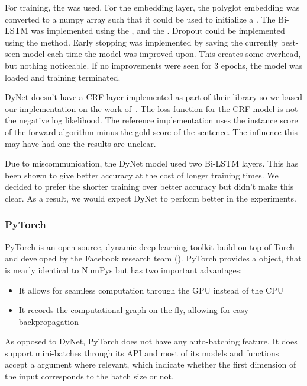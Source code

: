For training, the  was used. For the embedding layer, the
polyglot embedding was converted to a numpy array such that it could be used to
initialize a . The Bi-LSTM was implemented using the
, and the . Dropout could be implemented
using the  method. Early stopping was implemented by saving the
currently best-seen model each time the model was improved upon. This creates
some overhead, but nothing noticeable. If no improvements were seen for 3 epochs,
the model was loaded and training terminated.

DyNet doesn't have a CRF layer implemented as part of their library so we based
our implementation on the work of~\cite{plank2016multilingual}. The loss
function for the CRF model is not the negative log likelihood. The reference
implementation uses the instance score of the forward algorithm minus the
gold score of the sentence. The influence this may have had one the results are
unclear.

Due to miscommunication, the DyNet model used two Bi-LSTM layers. This has been
shown to give better accuracy at the cost of longer training times. We decided
to prefer the shorter training over better accuracy but didn't make this
clear. As a result, we would expect DyNet to perform better in the experiments. 


\subsubsection*{PyTorch}\label{sec:setup-implementations-pytorch}

PyTorch is an open source, dynamic deep learning toolkit build on top of Torch
and developed by the Facebook research team (\cite{yegulalp2017facebook}).
PyTorch provides a  object, that is nearly identical to NumPys
 but has two important advantages:

\begin{itemize}
    \item It allows for seamless computation through the GPU instead of the CPU
    \item It records the computational graph on the fly, allowing for easy
        backpropagation
\end{itemize}

As opposed to DyNet, PyTorch does not have any auto-batching feature. It does
support mini-batches through its API and most of its models and functions accept
a  argument where relevant, which indicate whether the first
dimension of the input corresponds to the batch size or not.

